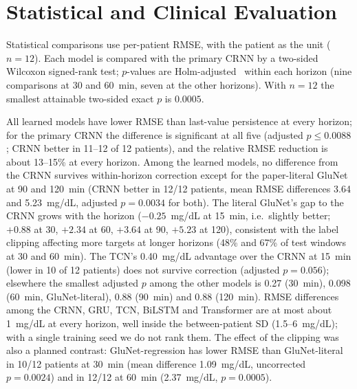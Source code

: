 \documentclass[conference]{IEEEtran}
\begin{document}
\section{Statistical and Clinical Evaluation}
Statistical comparisons use per-patient RMSE, with the patient as the unit ($n=12$). Each model is compared with the primary CRNN by a two-sided Wilcoxon signed-rank test; $p$-values are Holm-adjusted~\cite{holm} within each horizon (nine comparisons at 30 and 60~min, seven at the other horizons). With $n=12$ the smallest attainable two-sided exact $p$ is $0.0005$.

All learned models have lower RMSE than last-value persistence at every horizon; for the primary CRNN the difference is significant at all five (adjusted $p\le0.0088$; CRNN better in 11--12 of 12 patients), and the relative RMSE reduction is about 13--15\% at every horizon. Among the learned models, no difference from the CRNN survives within-horizon correction except for the paper-literal GluNet at 90 and 120~min (CRNN better in 12/12 patients, mean RMSE differences 3.64 and 5.23~mg/dL, adjusted $p=0.0034$ for both). The literal GluNet's gap to the CRNN grows with the horizon ($-0.25$~mg/dL at 15~min, i.e.\ slightly better; $+0.88$ at 30, $+2.34$ at 60, $+3.64$ at 90, $+5.23$ at 120), consistent with the label clipping affecting more targets at longer horizons (48\% and 67\% of test windows at 30 and 60~min). The TCN's 0.40~mg/dL advantage over the CRNN at 15~min (lower in 10 of 12 patients) does not survive correction (adjusted $p=0.056$); elsewhere the smallest adjusted $p$ among the other models is 0.27 (30~min), 0.098 (60~min, GluNet-literal), 0.88 (90~min) and 0.88 (120~min). RMSE differences among the CRNN, GRU, TCN, BiLSTM and Transformer are at most about 1~mg/dL at every horizon, well inside the between-patient SD (1.5--6~mg/dL); with a single training seed we do not rank them. The effect of the clipping was also a planned contrast: GluNet-regression has lower RMSE than GluNet-literal in 10/12 patients at 30~min (mean difference 1.09~mg/dL, uncorrected $p=0.0024$) and in 12/12 at 60~min (2.37~mg/dL, $p=0.0005$).
\end{document}
